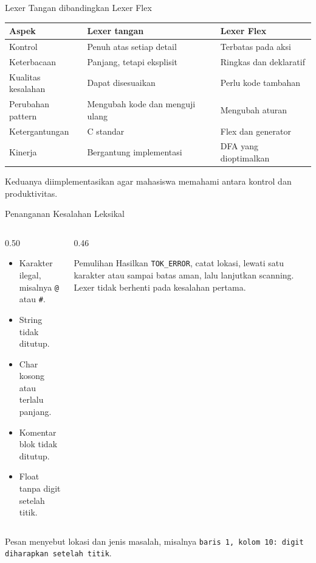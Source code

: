 \documentclass[aspectratio=169,10pt,t]{beamer}
\begin{document}
\begin{frame}{Lexer Tangan dibandingkan Lexer Flex}
  \small
  \setlength{\tabcolsep}{4pt}
  \begin{tabular}{@{}p{3.0cm}p{4.6cm}p{5.8cm}@{}}
    \toprule
    \textbf{Aspek} & \textbf{Lexer tangan} & \textbf{Lexer Flex} \\
    \midrule
    Kontrol & Penuh atas setiap detail & Terbatas pada aksi \\
    Keterbacaan & Panjang, tetapi eksplisit & Ringkas dan deklaratif \\
    Kualitas kesalahan & Dapat disesuaikan & Perlu kode tambahan \\
    Perubahan pattern & Mengubah kode dan menguji ulang & Mengubah aturan \\
    Ketergantungan & C standar & Flex dan generator \\
    Kinerja & Bergantung implementasi & DFA yang dioptimalkan \\
    \bottomrule
  \end{tabular}

  \vspace{4pt}
  {\footnotesize\color{ubbblue!80}Keduanya diimplementasikan agar
  mahasiswa memahami  antara kontrol dan produktivitas.}
\end{frame}

\begin{frame}{Penanganan Kesalahan Leksikal}
  \begin{columns}[T,onlytextwidth]
    \begin{column}{0.50\textwidth}
      \begin{itemize}
        \item Karakter ilegal, misalnya \texttt{@} atau \texttt{\#}.
        \item String tidak ditutup.
        \item Char kosong atau terlalu panjang.
        \item Komentar blok tidak ditutup.
        \item Float tanpa digit setelah titik.
      \end{itemize}
    \end{column}
    \begin{column}{0.46\textwidth}
      \begin{block}{Pemulihan}
        \footnotesize
        Hasilkan \texttt{TOK\_ERROR}, catat lokasi, lewati satu karakter
        atau sampai batas aman, lalu lanjutkan scanning. Lexer tidak
        berhenti pada kesalahan pertama.
      \end{block}
    \end{column}
  \end{columns}

  \vspace{4pt}
  {\footnotesize\color{ubbblue!80}Pesan menyebut lokasi dan jenis
  masalah, misalnya \texttt{baris 1, kolom 10: digit diharapkan setelah
  titik}.}
\end{frame}
\end{document}
